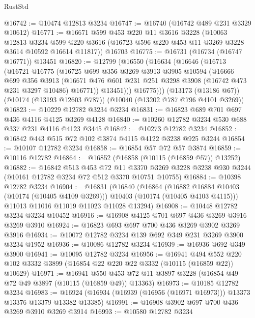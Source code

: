 \begin{lexlean}{RustStd}
\begin{coremodule}
@16742 := @10474 @12813 @3234
@16747 := @16740 (@16742 @489 @231 @3329 @10612)
@16771 := @16671
    @599
    @453
    @220
    @11
    @3616
    @3228
    (@10063
      @12813
      @3234
      @599
      @220
      @3616
      (@16723 @596 @220 @453 @11 @3269 @3228 @3614 @10592 @16614 @11817))
    @16703
@16775 := @16731 (@16734 (@16747 @16771)) @13451
@16820 := @12799
    (@16550
      (@16634
        (@16646
          (@16713
            (@16721
              @16775
              (@16725
                @699
                @356
                @3269
                @3913
                @3905
                @10594
                (@16666
                  @699
                  @356
                  @3913
                  (@16671 @476 @601 @231 @251 @3298 @3908 (@16742 @473 @231 @3297 @10486) @16771))
                @13451)))
          @16775)))
    (@13173 (@13186 @67))
    (@10174 (@13193 @12603 @787))
    (@10040 (@13202 @787 @796 @4101 @3269))
@16823 := @10229 @12782 @3234 @3234
@16831 := @16823 @689 @701 @697 @436 @4116 @4125 @3269 @4128
@16840 := @10260 @12782 @3234 @530 @688 @337 @231 @4116 @4123 @3445
@16842 := @10273 @12782 @3234
@16852 := @16842 @443 @515 @72 @102 @3874 @4115 @4122 @3238 @925 @3244
@16854 := @10107 @12782 @3234
@16858 := @16854 @57 @72 @57 @3874
@16859 := @10116 @12782
@16864 := @16852 (@16858 (@10115 (@16859 @57)) @13252)
@16882 := @16842
    @513
    @453
    @72
    @11
    @3370
    @3269
    @3228
    @3238
    @930
    @3244
    (@10161 @12782 @3234 @72 @512 @3370 @10751 @10755)
@16884 := @10398 @12782 @3234
@16904 := @16831
    (@16840
      (@16864
        (@16882 @16884 @10403 (@10174 (@10405 @4109 @3269)))
        @10403
        (@10174 (@10405 @4103 @4115)))
      @11013
      @11016
      @11019
      @11023
      @11028
      @13294)
@16908 := @10448 @12782 @3234 @3234 @10452
@16916 := @16908 @4125 @701 @697 @436 @3269 @3916 @3269 @3910
@16924 := @16823 @693 @697 @700 @436 @3269 @3902 @3269 @3916
@16934 := @10072 @12782 @3234 @139 @692 @349 @231 @3269 @3900 @3234 @1952
@16936 := @10086 @12782 @3234
@16939 := @16936 @692 @349 @3900
@16941 := @10095 @12782 @3234
@16956 := @16941
    @494
    @552
    @220
    @102
    @3332
    @3899
    (@16854 @22 @220 @22 @3332 (@10115 (@16859 @22)) @10629)
@16971 := @16941
    @550
    @453
    @72
    @11
    @3897
    @3228
    (@16854 @49 @72 @49 @3897 (@10115 (@16859 @49)) @13363)
@16973 := @10185 @12782 @3234
@16983 := @16924 (@16934 (@16939 (@16956 (@16971 @16973))) @13373 @13376 @13379 @13382 @13385)
@16991 := @16908 @3902 @697 @700 @436 @3269 @3910 @3269 @3914
@16993 := @10580 @12782 @3234

\end{coremodule}
\end{lexlean}
